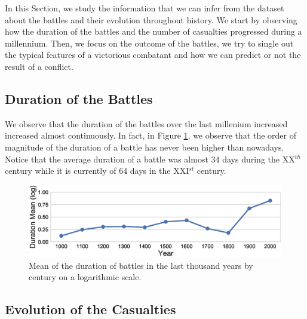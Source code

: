 In this Section, we study the information that we can infer from the dataset about the battles and their evolution throughout history. We start by observing how the duration of the battles and the number of casualties progressed during a millennium. Then, we focus on the outcome of the battles, we try to single out the typical features of a victorious combatant and how we can predict or not the result of a conflict. 

\subsection{Duration of the Battles}

We observe that the duration of the battles over the last millenium increased increased almost continuously. In fact, in Figure \ref{fig:durThByCent}, we observe that the order of magnitude of the duration of a battle has never been higher than nowadays. Notice that the average duration of a battle was almost 34 days during the XX$^{th}$ century while it is currently of 64 days in the XXI$^{st}$ century.

 \begin{figure}[h]
	\centering	\includegraphics[width=\linewidth]{figures/durThByCent}
	\caption{Mean of the duration of battles in the last thousand years by century on a logarithmic scale.}\label{fig:durThByCent}
	\centering
\end{figure}

\subsection{Evolution of the Casualties}

